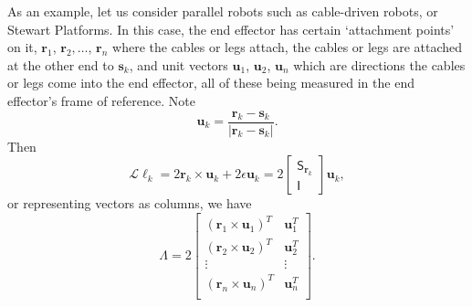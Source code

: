 \documentclass[reqno,12pt]{amsart}
\newcommand\starop[1]{\mathsf S_{#1}}
\begin{document}
As an example, let us consider parallel robots such as cable-driven robots, or Stewart Platforms.  In this case, the end effector has certain `attachment points' on it, $\bm r_1$, $\bm r_2,\dots$, $\bm r_n$ where the cables or legs attach, the cables or legs are attached at the other end to $\bm s_k$,
and unit vectors $\bm u_1$, $\bm u_2$, $\bm u_n$ which are directions the cables or legs come into the end effector, all of these being measured in the end effector's frame of reference.  Note
\begin{equation}
\bm u_k = \frac{\bm r_k - \bm s_k}{|\bm r_k - \bm s_k|} .
\end{equation}
Then
\begin{equation}
\label{L ell_k}
\mathcal L \ell_k = 2 \bm r_k \times \bm u_k + 2 \epsilon \bm u_k = 2 \begin{bmatrix} \starop{\bm r_k} \\ \mathsf I \end{bmatrix} \bm u_k,
\end{equation}
or representing vectors as columns, we have
\begin{equation}
\label{Lambda stewart platform}
\mathsf\Lambda = 2 \begin{bmatrix}
(\bm r_1 \times \bm u_1)^T & \bm u_1^T \\
(\bm r_2 \times \bm u_2)^T & \bm u_2^T \\
\vdots & \vdots \\
(\bm r_n \times \bm u_n)^T & \bm u_n^T \\
\end{bmatrix} .
\end{equation}
\end{document}
